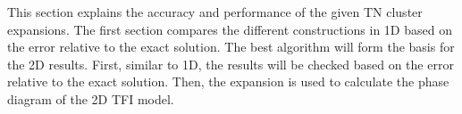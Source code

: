 This section explains the accuracy and performance of the given \Gls{TN} cluster expansions. The first section compares the different constructions in 1D based on the error relative to the exact solution. The best algorithm will form the basis for the 2D results. First, similar to 1D, the results will be checked based on the error relative to the exact solution. Then, the expansion is used to calculate the phase diagram of the 2D \Gls{TFI} model.
